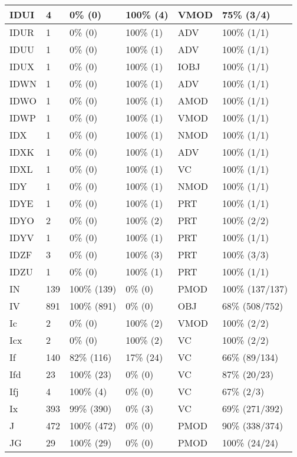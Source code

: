 \begin{figure*}
\begin{tabular}{|l|l|l|l||l|l|}
\hline
 IDUI & 4 & 0\% (0) & 100\% (4) & VMOD & 75\% (3/4) \\ 
\hline
 IDUR & 1 & 0\% (0) & 100\% (1) & ADV & 100\% (1/1) \\ 
\hline
 IDUU & 1 & 0\% (0) & 100\% (1) & ADV & 100\% (1/1) \\ 
\hline
 IDUX & 1 & 0\% (0) & 100\% (1) & IOBJ & 100\% (1/1) \\ 
\hline
 IDWN & 1 & 0\% (0) & 100\% (1) & ADV & 100\% (1/1) \\ 
\hline
 IDWO & 1 & 0\% (0) & 100\% (1) & AMOD & 100\% (1/1) \\ 
\hline
 IDWP & 1 & 0\% (0) & 100\% (1) & VMOD & 100\% (1/1) \\ 
\hline
 IDX & 1 & 0\% (0) & 100\% (1) & NMOD & 100\% (1/1) \\ 
\hline
 IDXK & 1 & 0\% (0) & 100\% (1) & ADV & 100\% (1/1) \\ 
\hline
 IDXL & 1 & 0\% (0) & 100\% (1) & VC & 100\% (1/1) \\ 
\hline
 IDY & 1 & 0\% (0) & 100\% (1) & NMOD & 100\% (1/1) \\ 
\hline
 IDYE & 1 & 0\% (0) & 100\% (1) & PRT & 100\% (1/1) \\ 
\hline
 IDYO & 2 & 0\% (0) & 100\% (2) & PRT & 100\% (2/2) \\ 
\hline
 IDYV & 1 & 0\% (0) & 100\% (1) & PRT & 100\% (1/1) \\ 
\hline
 IDZF & 3 & 0\% (0) & 100\% (3) & PRT & 100\% (3/3) \\ 
\hline
 IDZU & 1 & 0\% (0) & 100\% (1) & PRT & 100\% (1/1) \\ 
\hline
 IN & 139 & 100\% (139) & 0\% (0) & PMOD & 100\% (137/137) \\ 
\hline
 IV & 891 & 100\% (891) & 0\% (0) & OBJ & 68\% (508/752) \\ 
\hline
 Ic & 2 & 0\% (0) & 100\% (2) & VMOD & 100\% (2/2) \\ 
\hline
 Icx & 2 & 0\% (0) & 100\% (2) & VC & 100\% (2/2) \\ 
\hline
 If & 140 & 82\% (116) & 17\% (24) & VC & 66\% (89/134) \\ 
\hline
 Ifd & 23 & 100\% (23) & 0\% (0) & VC & 87\% (20/23) \\ 
\hline
 Ifj & 4 & 100\% (4) & 0\% (0) & VC & 67\% (2/3) \\ 
\hline
 Ix & 393 & 99\% (390) & 0\% (3) & VC & 69\% (271/392) \\ 
\hline
 J & 472 & 100\% (472) & 0\% (0) & PMOD & 90\% (338/374) \\ 
\hline
 JG & 29 & 100\% (29) & 0\% (0) & PMOD & 100\% (24/24) \\ 
\hline
\end{tabular}
\end{figure*}
